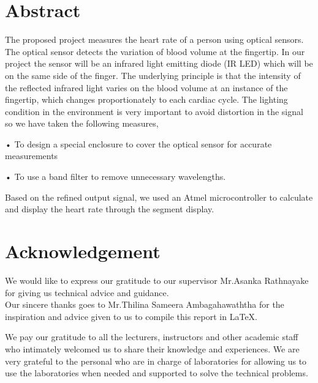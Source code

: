 \documentclass[12pt]{article}
\begin{document}
\begin{titlepage}
	\vfill
	
\end{titlepage}

\newpage
\section{Abstract}
The proposed project measures the heart rate of a person using optical sensors. 
The optical sensor detects the variation of blood volume at the fingertip.
In our project the sensor will be an infrared light emitting diode (IR LED) which will be on the same side of the finger.
The underlying principle is that the intensity of the reflected infrared light varies on the blood volume at an instance of the fingertip, which changes proportionately to each cardiac cycle. 
The lighting condition in the environment is very important to avoid distortion in the signal so we have taken the following measures,

• To design a special enclosure to cover the optical sensor for accurate measurements

• To use a band filter to remove unnecessary wavelengths.

Based on the refined output signal, we used an Atmel microcontroller to calculate and display the heart rate through the segment display.

\section{Acknowledgement}
We would like to express our gratitude to our supervisor Mr.Asanka Rathnayake for giving us technical advice and guidance.\\
Our sincere thanks goes to Mr.Thilina Sameera Ambagahawaththa for the inspiration and advice given to us to compile this report in LaTeX.

We pay our gratitude to all the lecturers, instructors and other academic staff who intimately welcomed us to share their knowledge and experiences. We are very grateful to the personal who are in charge of laboratories for allowing us to use the laboratories when needed and supported to solve the technical problems.

\newpage
\tableofcontents
\pagebreak


\end{document}
